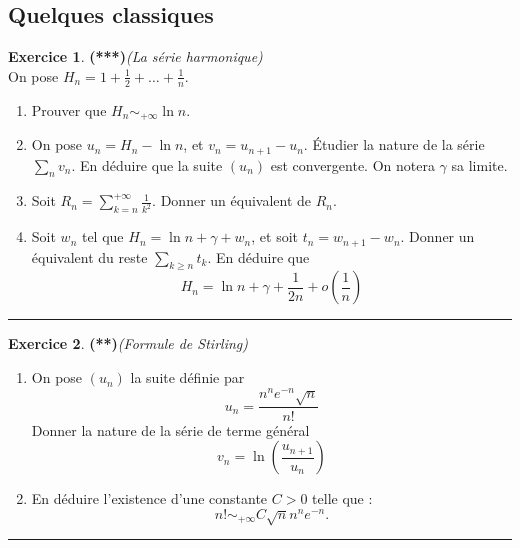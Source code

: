 \documentclass[a4paper,11pt]{article}
\theoremstyle{definition}
\newtheorem{exo}{Exercice} %
\newcommand{\disp}{\displaystyle}
\begin{document}
\begin{minipage}{1\linewidth}
\begin{minipage}[t]{0.48\linewidth}
		
	\end{minipage}\hfill\vrule\hfill\begin{minipage}[t]{0.48\linewidth}\raggedright
		
		\subsection*{Quelques classiques}
		\begin{exo}\textbf{(***)}\quad\textit{(La série harmonique)}\\[0.2cm]
			On pose $\disp H_n=1+\frac12+\dots+\frac1n$. 
			\begin{enumerate}
				\item Prouver que $\disp H_n\sim_{+\infty}\ln n$.
				\item On pose $\disp u_n=H_n-\ln n$, et $v_n=u_{n+1}-u_n$.
				\'Etudier la nature de la série $\disp \sum_n v_n$. En déduire que la suite $(u_n)$ est convergente. On notera $\gamma$ sa limite.
				\item Soit $\disp R_n=\sum_{k=n}^{+\infty} \frac{1}{k^2}$. Donner un équivalent de $R_n$.
				\item Soit $w_n$ tel que $\disp H_n=\ln n+\gamma+w_n$, et soit 
				$\disp t_n=w_{n+1}-w_n$. Donner un équivalent du reste $\disp \sum_{k\geq n}t_k$.
				En déduire que\\[-0.2cm] $$\disp H_n=\ln n+\gamma+\frac{1}{2n}+o\left(\frac1n\right)$$
			\end{enumerate}
			
			
			\centering\rule{1\linewidth}{0.6pt}\end{exo}
		
			\begin{exo}\textbf{(**)}\quad\textit{(Formule de Stirling)}\\[0.2cm]
			\begin{enumerate}
				\item On pose  $(u_n)$ la suite définie par $$\disp u_n=\frac{n^ne^{-n}\sqrt{n}}{n!}$$ 
				Donner la nature de la série de terme général $$\disp v_n=\ln\left(\frac{u_{n+1}}{u_n}\right)$$ 
				\item En déduire l'existence d'une constante $C>0$ telle que :\\[-0.2cm]
				$$n!\sim_{+\infty} C\sqrt{n}n^ne^{-n}.$$
			\end{enumerate}
			
			\centering\rule{1\linewidth}{0.6pt}\end{exo}
		
\end{minipage}\end{minipage}
\end{document}
